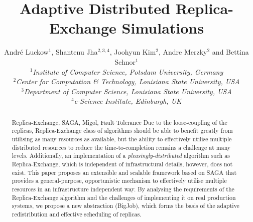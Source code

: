 \documentclass{rspublic}
\title[Adaptive Distributed Replica-Exchange Simulations]{Adaptive Distributed
  Replica-Exchange Simulations}
\author[Luckow, Jha, Kim, Merzky, Schnor]{
  Andr\'e Luckow$^{1}$, Shantenu Jha$^{2,3,4}$, Joohyun Kim$^{2}$, Andre Merzky$^{2}$ and Bettina Schnor$^{1}$\\
  \small{\emph{$^{1}$Institute of Computer Science, Potsdam University, Germany}}\\
  \small{\emph{$^{2}$Center for Computation \& Technology, Louisiana State University, USA}}\\
  \small{\emph{$^{3}$Department of Computer Science, Louisiana State
      University, USA}}\\
  \small{\emph{$^{4}$e-Science Institute, Edinburgh, UK}}\\
}
\begin{document}
 


\maketitle    


\begin{abstract}{Replica-Exchange, SAGA, Migol, Fault Tolerance}  
  Due to the loose-coupling of the replicas, Replica-Exchange class of
  algorithms should be able to benefit greatly from utilising as many
  resources as available, but the ability to effectively utilise
  multiple distributed resources to reduce the time-to-com\-ple\-tion
  remains a challenge at many levels.  Additionally, an implementation
  of a {\it pleasingly-distributed} algorithm such as
  Replica-Exchange, which is independent of infrastructural details,
  however, does not exist.  This paper proposes an extensible and
  scalable framework based on SAGA that provides a general-purpose,
  opportunistic mechanism to effectively utilise multiple resources in
  an infrastructure independent way. By analysing the requirements of
  the Replica-Exchange algorithm and the challenges of implementing it
  on real production systems, we propose a new abstraction (BigJob),
  which forms the basis of the adaptive redistribution and effective
  scheduling of replicas.
\end{abstract}
\end{document}

